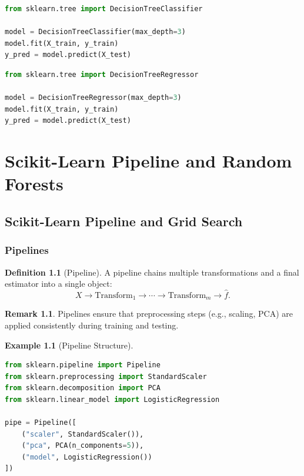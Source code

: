 \documentclass[12pt,oneside]{book}
\numberwithin{equation}{section}
\theoremstyle{definition}
\newtheorem{definition}{Definition}[section]
\newtheorem{example}{Example}[section]
\newtheorem{remark}{Remark}[section]
\theoremstyle{plain}
\theoremstyle{remark}
\begin{document}
\begin{lstlisting}[language=Python]
from sklearn.tree import DecisionTreeClassifier

model = DecisionTreeClassifier(max_depth=3)
model.fit(X_train, y_train)
y_pred = model.predict(X_test)
\end{lstlisting}

\begin{lstlisting}[language=Python]
from sklearn.tree import DecisionTreeRegressor

model = DecisionTreeRegressor(max_depth=3)
model.fit(X_train, y_train)
y_pred = model.predict(X_test)
\end{lstlisting}

\chapter{Scikit-Learn Pipeline and Random Forests}

\section{Scikit-Learn Pipeline and Grid Search}

\subsection{Pipelines}

\begin{definition}[Pipeline]
A pipeline chains multiple transformations and a final estimator into a single object:
\[
X \rightarrow \text{Transform}_1 \rightarrow \cdots \rightarrow \text{Transform}_m \rightarrow \hat{f}.
\]
\end{definition}

\begin{remark}
Pipelines ensure that preprocessing steps (e.g., scaling, PCA) are applied consistently during training and testing.
\end{remark}

\begin{example}[Pipeline Structure]
\begin{lstlisting}[language=Python]
from sklearn.pipeline import Pipeline
from sklearn.preprocessing import StandardScaler
from sklearn.decomposition import PCA
from sklearn.linear_model import LogisticRegression

pipe = Pipeline([
    ("scaler", StandardScaler()),
    ("pca", PCA(n_components=5)),
    ("model", LogisticRegression())
])
\end{lstlisting}
\end{example}
\end{document}
